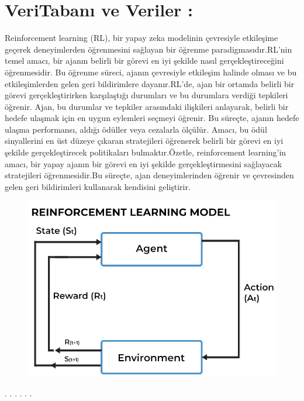 \documentclass[12pt, a4paper]{article}
\begin{document}
\section {VeriTabanı ve Veriler :}%

Reinforcement learning (RL), bir yapay zeka modelinin çevresiyle etkileşime 
geçerek deneyimlerden öğrenmesini sağlayan bir öğrenme paradigmasıdır.RL'nin temel amacı, bir ajanın belirli bir görevi en iyi şekilde nasıl gerçekleştireceğini öğrenmesidir. Bu öğrenme süreci, ajanın çevresiyle etkileşim halinde olması ve bu etkileşimlerden gelen geri bildirimlere dayanır.RL'de, ajan bir ortamda belirli bir görevi gerçekleştirirken karşılaştığı durumları ve bu durumlara verdiği tepkileri öğrenir. Ajan, bu durumlar ve tepkiler arasındaki ilişkileri anlayarak, belirli bir hedefe ulaşmak için en uygun eylemleri seçmeyi öğrenir. Bu süreçte, ajanın hedefe ulaşma performansı, aldığı ödüller veya cezalarla ölçülür. Amacı, bu ödül sinyallerini en üst düzeye çıkaran stratejileri öğrenerek belirli bir görevi en iyi şekilde gerçekleştirecek politikaları bulmaktır.Özetle, reinforcement learning'in amacı, bir yapay ajanın bir görevi en iyi şekilde gerçekleştirmesini sağlayacak stratejileri öğrenmesidir.Bu süreçte, ajan deneyimlerinden öğrenir ve çevresinden gelen geri bildirimleri kullanarak kendisini geliştirir.

	\begin{figure}[h]
	\centering		
	\includegraphics[height= 5 cm]{photo1-}		
	\label{}
\end{figure} 
\centering 


	
	
	
	
	\cite{berner2019dota}.
	\cite{gokcce2013implementation}.
	\cite{aydin2020using}.
	\cite{openai_chatgpt}
	\cite{gullu2017labirentlerde}.
	\cite{boluk2019mobil}.
	\cite{kavasougluyapay}.

		
	
	
	
\end{document}
